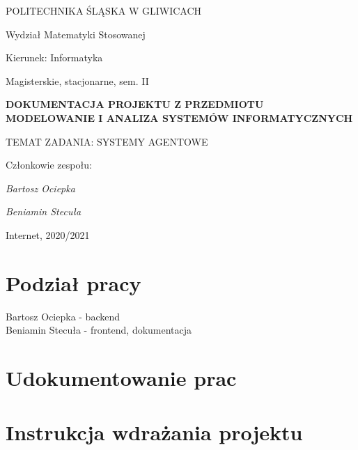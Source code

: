 \documentclass[12pt,a4paper]{article}
\begin{document}
\nocite{*}

\clearpage
\hspace{3cm}
\begin{center}POLITECHNIKA ŚLĄSKA W GLIWICACH\end{center}
\begin{center}Wydział Matematyki Stosowanej\end{center}
\begin{center}Kierunek: Informatyka\end{center}
\begin{center}Magisterskie, stacjonarne, sem. II\end{center}
\hspace{3cm}
\begin{center}\large\textbf{DOKUMENTACJA PROJEKTU Z PRZEDMIOTU\\MODELOWANIE I ANALIZA SYSTEMÓW INFORMATYCZNYCH}\end{center}
\hspace{10cm}
\begin{center}TEMAT ZADANIA: SYSTEMY AGENTOWE\end{center}
\hspace{5cm}
\begin{flushright}Członkowie zespołu:
\par
\textit{Bartosz Ociepka}
\par
\textit{Beniamin Stecuła}
\end{flushright}
\vfill
\begin{center}Internet, 2020/2021\end{center}

\newpage
\section{Podział pracy}

\begin{center}Bartosz Ociepka - backend\\Beniamin Stecuła - frontend, dokumentacja\end{center}

\section{Udokumentowanie prac}
\newpage

\section{Instrukcja wdrażania projektu}
\end{document}
